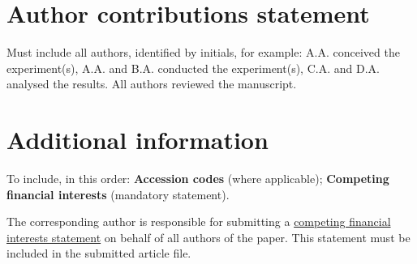 \documentclass[fleqn,10pt]{wlscirep}
\begin{document}
\section*{Author contributions statement}
Must include all authors, identified by initials, for example:
A.A. conceived the experiment(s), A.A. and B.A. conducted the
experiment(s), C.A. and D.A. analysed the results. All authors
reviewed the manuscript.

\section*{Additional information}

To include, in this order: \textbf{Accession codes} (where
applicable); \textbf{Competing financial interests} (mandatory
statement).

The corresponding author is responsible for submitting a
\href{http://www.nature.com/srep/policies/index.html#competing}{competing
  financial interests statement} on behalf of all authors of the
paper. This statement must be included in the submitted article file.
\end{document}
